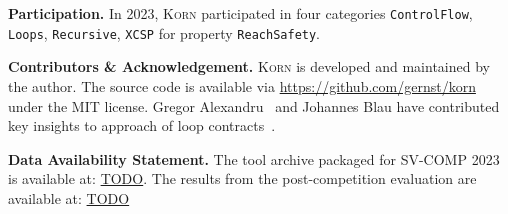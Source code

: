 \documentclass{llncs}
\newcommand{\Korn}{\textsc{Korn}\xspace}
\begin{document}
\smallskip

\textbf{Participation.} In 2023, \Korn participated in four categories
\texttt{ControlFlow},
\texttt{Loops},
\texttt{Recursive},
\texttt{XCSP}
for property \texttt{ReachSafety}.

% 
% 
% 
% 
% 
% 
% 
% 
% 
% 
% 

% 

\smallskip

\textbf{Contributors \& Acknowledgement.}
\Korn is developed and maintained by the author.
The source code is available via \url{https://github.com/gernst/korn} under the MIT license.
Gregor Alexandru~\cite{alexandru2019} and Johannes Blau have contributed
key insights to approach of loop contracts~\cite{ernst:vmcai2022}.

\smallskip

\textbf{Data Availability Statement.}
The tool archive packaged for SV-COMP 2023 is available at:
\url{TODO}.
The results from the post-competition evaluation are available at:
\url{TODO}



\end{document}
